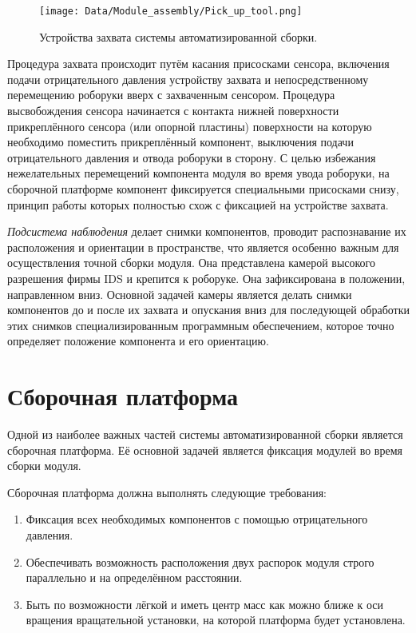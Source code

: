 \begin{figure}[ht]\centering
\texttt{[image: Data/Module\_assembly/Pick\_up\_tool.png]}
\caption{Устройства захвата системы автоматизированной сборки.}
\label{fig:pick_up_tool}
\end{figure}

Процедура захвата происходит путём касания присосками сенсора, включения подачи отрицательного давления устройству захвата и непосредственному перемещению роборуки вверх с захваченным сенсором. Процедура высвобождения сенсора начинается с контакта нижней поверхности прикреплённого сенсора (или опорной пластины) поверхности на которую необходимо поместить прикреплённый компонент, выключения подачи отрицательного давления и отвода роборуки в сторону. С целью избежания нежелательных перемещений компонента модуля во время увода роборуки, на сборочной платформе компонент фиксируется специальными присосками снизу, принцип работы которых полностью схож с фиксацией на устройстве захвата.

\emph{Подсистема наблюдения} делает снимки компонентов, проводит распознавание их расположения и ориентации в пространстве, что является особенно важным для осуществления точной сборки модуля. Она представлена камерой высокого разрешения фирмы IDS и крепится к роборуке. Она зафиксирована в положении, направленном вниз. Основной задачей камеры является делать снимки компонентов до и после их захвата и опускания вниз для последующей обработки этих снимков специализированным программным обеспечением, которое точно определяет положение компонента и его ориентацию.

\section{Сборочная платформа}

Одной из наиболее важных частей системы автоматизированной сборки является сборочная платформа. Её основной задачей является фиксация модулей во время сборки модуля.

Сборочная платформа должна выполнять следующие требования:

\begin{enumerate}
\setlength\itemsep{-0.5em}
\item Фиксация всех необходимых компонентов с помощью отрицательного давления.
\item Обеспечивать возможность расположения двух распорок модуля строго параллельно и на определённом расстоянии.
\item Быть по возможности лёгкой и иметь центр масс как можно ближе к оси вращения вращательной установки, на которой платформа будет установлена.
\end{enumerate}

